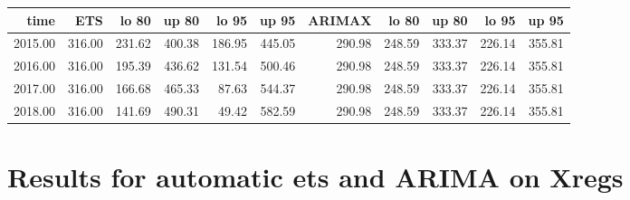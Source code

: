\documentclass[10pt,a4paper]{article}\usepackage[]{graphicx}\usepackage[]{color}
\begin{document}
\begin{table}[ht]
\centering
\begin{tabular}{rrrrrrrrrrr}
  \hline
time & ETS  & lo 80 & up 80 & lo 95 & up 95 & ARIMAX  & lo 80 & up 80 & lo 95 & up 95 \\ 
  \hline
2015.00 & 316.00 & 231.62 & 400.38 & 186.95 & 445.05 & 290.98 & 248.59 & 333.37 & 226.14 & 355.81 \\ 
  2016.00 & 316.00 & 195.39 & 436.62 & 131.54 & 500.46 & 290.98 & 248.59 & 333.37 & 226.14 & 355.81 \\ 
  2017.00 & 316.00 & 166.68 & 465.33 & 87.63 & 544.37 & 290.98 & 248.59 & 333.37 & 226.14 & 355.81 \\ 
  2018.00 & 316.00 & 141.69 & 490.31 & 49.42 & 582.59 & 290.98 & 248.59 & 333.37 & 226.14 & 355.81 \\ 
   \hline
\end{tabular}
\end{table}

\newpage



\section{Results for automatic ets and ARIMA on Xregs}
\end{document}
